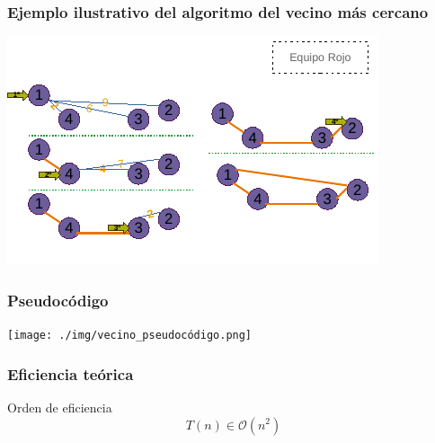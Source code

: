 \documentclass[13pt]{beamer}
\begin{document}
    \begin{frame}
		\frametitle{Ejemplo ilustrativo del algoritmo del vecino más cercano}
		\begin{center}
			\includegraphics[scale=1.5]{./img/DibVecCercano.pdf}
		\end{center}
	\end{frame}

	\begin{frame}
		\frametitle{Pseudocódigo}
		\begin{center}
			\texttt{[image: ./img/vecino\_pseudocódigo.png]}
		\end{center}
	\end{frame}

	\begin{frame}
		\frametitle{Eficiencia teórica}
		\begin{block}{Orden de eficiencia}
			$$T(n) \in \mathcal{O}(n^2)$$
		\end{block}
	\end{frame}
\end{document}

